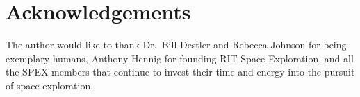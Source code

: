 \documentclass[conference]{IEEEtran} %
\begin{document}
\section*{Acknowledgements}
The author would like to thank Dr.~Bill Destler and Rebecca Johnson for being exemplary humans, Anthony Hennig for founding RIT Space Exploration, and all the SPEX members that continue to invest their time and energy into the pursuit of space exploration.

%
%

\end{document}
